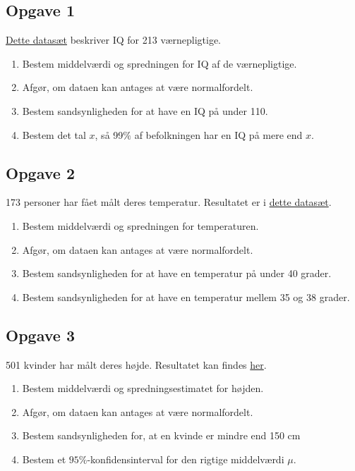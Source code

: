 
\subsection*{Opgave 1}
\href{https://github.com/ChristianJLex/TeachingNotes/raw/master/2022-2023/Data%20og%20lign/IQdata.xlsx}{\color{blue!60}Dette datasæt} beskriver IQ for 213 værnepligtige. 
\begin{enumerate}[label=\roman*)]
	\item Bestem middelværdi og spredningen for IQ af de værnepligtige.
	\item Afgør, om dataen kan antages at være normalfordelt. 
	\item Bestem sandsynligheden for at have en IQ på under 110.
	\item Bestem det tal $x$, så 99$\%$ af befolkningen har en IQ på mere end $x$. 
\end{enumerate}

\subsection*{Opgave 2}
173 personer har fået målt deres temperatur. Resultatet er i \href{https://github.com/ChristianJLex/TeachingNotes/raw/master/2022-2023/Data%20og%20lign/Temperaturdata.xlsx}{\color{blue!60} dette datasæt}.
\begin{enumerate}[label=\roman*)]
	\item Bestem middelværdi og spredningen for temperaturen.
	\item Afgør, om dataen kan antages at være normalfordelt. 
	\item Bestem sandsynligheden for at have en temperatur på under 40 grader. 
	\item Bestem sandsynligheden for at have en temperatur mellem 35 og 38 grader.  
\end{enumerate}


\subsection*{Opgave 3}
501 kvinder har målt deres højde. Resultatet kan findes \href{https://github.com/ChristianJLex/TeachingNotes/raw/master/2022-2023/Data%20og%20lign/Hojdedata.xlsx}{\color{blue!60}her}.
\begin{enumerate}[label=\roman*)]
	\item Bestem middelværdi og spredningsestimatet for højden.
	\item Afgør, om dataen kan antages at være normalfordelt.
	\item Bestem sandsynligheden for, at en kvinde er mindre end 150 cm
	\item Bestem et $95\%$-konfidensinterval for den rigtige middelværdi $\mu$. 
\end{enumerate}

